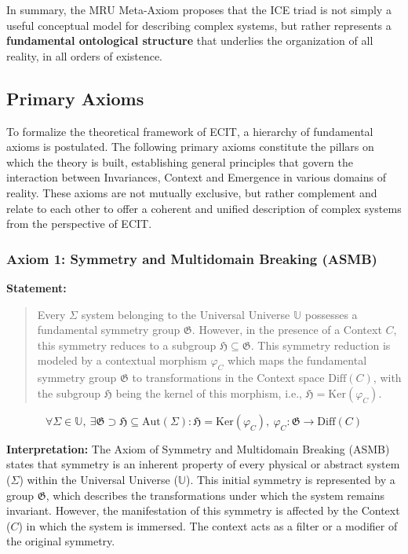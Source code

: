 \documentclass{article}
\begin{document}
In summary, the MRU Meta-Axiom proposes that the ICE triad is not simply a useful conceptual model for describing complex systems, but rather represents a \textbf{fundamental ontological structure} that underlies the organization of all reality, in all orders of existence.

\subsection{Primary Axioms}
To formalize the theoretical framework of ECIT, a hierarchy of fundamental axioms is postulated. The following primary axioms constitute the pillars on which the theory is built, establishing general principles that govern the interaction between Invariances, Context and Emergence in various domains of reality. These axioms are not mutually exclusive, but rather complement and relate to each other to offer a coherent and unified description of complex systems from the perspective of ECIT.

\subsubsection{Axiom 1: Symmetry and Multidomain Breaking (ASMB)}
\textbf{Statement:}
\begin{quote}
Every $\Sigma$ system belonging to the Universal Universe $\mathbb{U}$ possesses a fundamental symmetry group $\mathfrak{G}$. However, in the presence of a Context $C$, this symmetry reduces to a subgroup $\mathfrak{H} \subseteq \mathfrak{G}$. This symmetry reduction is modeled by a contextual morphism $\varphi_C$ which maps the fundamental symmetry group $\mathfrak{G}$ to transformations in the Context space $\text{Diff}(C)$, with the subgroup $\mathfrak{H}$ being the kernel of this morphism, i.e., $\mathfrak{H} = \text{Ker}(\varphi_C)$.
\end{quote}
    

\begin{equation}
\forall \Sigma \in \mathbb{U},\ \exists \mathfrak{G} \supset \mathfrak{H} \subseteq \text{Aut}(\Sigma): \mathfrak{H} = \text{Ker}(\varphi_C),\ \varphi_C: \mathfrak{G} \to \text{Diff}(C)
\end{equation}

\textbf{Interpretation:} 
The Axiom of Symmetry and Multidomain Breaking (ASMB) states that symmetry is an inherent property of every physical or abstract system ($\Sigma$) within the Universal Universe ($\mathbb{U}$). This initial symmetry is represented by a group $\mathfrak{G}$, which describes the transformations under which the system remains invariant. However, the manifestation of this symmetry is affected by the Context ($C$) in which the system is immersed. The context acts as a filter or a modifier of the original symmetry.
\end{document}
